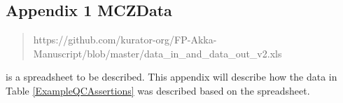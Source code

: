 \begin{appendices}
\large
\section*{Appendix 1 MCZData}
\normalsize
\begin{quote}https://github.com/kurator-org/FP-Akka-Manuscript/blob/master/data\_in\_and\_data\_out\_v2.xls\end{quote} is a spreadsheet to be described. This appendix will describe how the data in Table \ref{ExampleQCAssertions} was described based on the spreadsheet.
\end{appendices}
